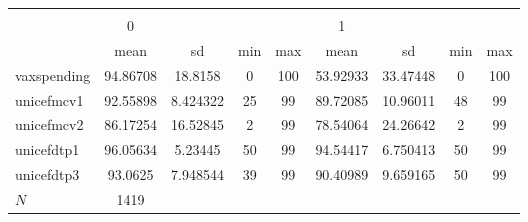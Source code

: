 \begin{tabular}{l*{2}{cccc}}
\hline\hline
                    &\multicolumn{8}{c}{}                                                                                   \\
                    &           0&            &            &            &           1&            &            &            \\
                    &        mean&          sd&         min&         max&        mean&          sd&         min&         max\\
\hline
vaxspending         &    94.86708&     18.8158&           0&         100&    53.92933&    33.47448&           0&         100\\
unicefmcv1          &    92.55898&    8.424322&          25&          99&    89.72085&    10.96011&          48&          99\\
unicefmcv2          &    86.17254&    16.52845&           2&          99&    78.54064&    24.26642&           2&          99\\
unicefdtp1          &    96.05634&     5.23445&          50&          99&    94.54417&    6.750413&          50&          99\\
unicefdtp3          &     93.0625&    7.948544&          39&          99&    90.40989&    9.659165&          50&          99\\
\hline
\(N\)               &        1419&            &            &            &            &            &            &            \\
\hline\hline
\end{tabular}
